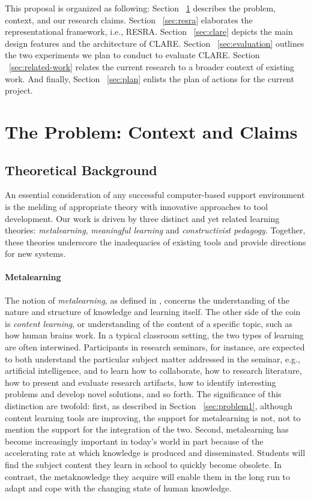 This proposal is organized as following: Section ~\ref{sec:problem}
describes the problem, context, and our research claims. Section
~\ref{sec:resra} elaborates the representational framework, i.e., RESRA.
Section ~\ref{sec:clare} depicts the main design features and the
architecture of CLARE. Section ~\ref{sec:evaluation} outlines the two
experiments we plan to conduct to evaluate CLARE. Section
~\ref{sec:related-work} relates the current research to a broader context
of existing work.  And finally, Section ~\ref{sec:plan} enlists the plan of
actions for the current project.

\section{The Problem: Context and Claims}
\label{sec:problem}

\subsection{Theoretical Background}
\label{sec:motivation}

An essential consideration of any successful computer-based support
environment is the melding of appropriate theory with innovative approaches
to tool development. Our work is driven by three distinct and yet related
learning theories: {\it metalearning\/}, {\it meaningful learning\/} and
{\it constructivist pedagogy\/}. Together, these theories underscore the
inadequacies of existing tools and provide directions for new systems.

\paragraph{Metalearning}

The notion of {\it metalearning\/}, as defined in \cite{Novak84}, concerns
the understanding of the nature and structure of knowledge and learning
itself. The other side of the coin is {\it content learning\/}, or
understanding of the content of a specific topic, such as how human brains
work. In a typical classroom setting, the two types of learning are often
interwined. Participants in research seminars, for instance, are expected
to both understand the particular subject matter addressed in the seminar,
e.g., artificial intelligence, and to learn how to collaborate, how to
research literature, how to present and evaluate research artifacts, how to
identify interesting problems and develop novel solutions, and so forth.
The significance of this distinction are twofold: first, as described in
Section ~\ref{sec:problem1}, although content learning tools are improving,
the support for metalearning is not, not to mention the support for the
integration of the two. Second, metalearning has become increasingly
important in today's world in part because of the accelerating rate at
which knowledge is produced and disseminated. Students will find the
subject content they learn in school to quickly become obsolete. In
contrast, the metaknowledge they acquire will enable them in the long run
to adapt and cope with the changing state of human knowledge.

